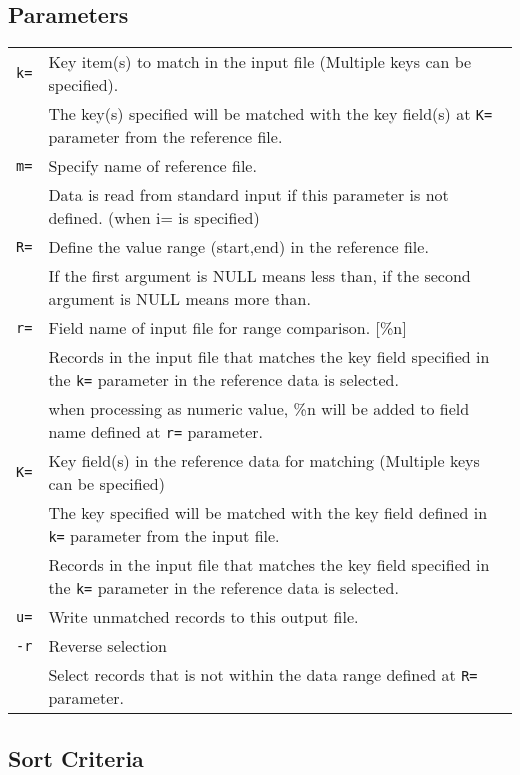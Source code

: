 \subsection*{Parameters}
\begin{table}[htbp]
{\small
\begin{tabular}{ll}
\verb|k=|    & Key item(s) to match in the input file (Multiple keys can be specified). \\
             & The key(s) specified will be matched with the key field(s) at \verb|K=| parameter from the reference file. \\
\verb|m=|    & Specify name of reference file.\\
		& Data is read from standard input if this parameter is not defined. (when i= is specified)\\
\verb|R=|    & Define the value range (start,end) in the reference file. \\ 
             & If the first argument is NULL means less than, if the second argument is NULL means more than. \\
\verb|r=|    & Field name of input file for range comparison. [\%{n}]\\
             & Records in the input file that matches the key field specified in the \verb|k=| parameter in the reference data is selected.\\
                    & when processing as numeric value, \%n will be added to field name defined at \verb|r=| parameter. \\
\verb|K=|    &  Key field(s) in the reference data for matching (Multiple keys can be specified) \\	
             & The key specified will be matched with the key field defined in \verb|k=| parameter from the input file.  \\
             & Records in the input file that matches the key field specified in the \verb|k=| parameter in the reference data is selected. \\
\verb|u=|    & Write unmatched records to this output file. \\
\verb|-r|    & Reverse selection\\
             & Select records that is not within the data range defined at \verb|R=| parameter. \\
\end{tabular} 
}
\end{table} 


\subsection*{Sort Criteria}

